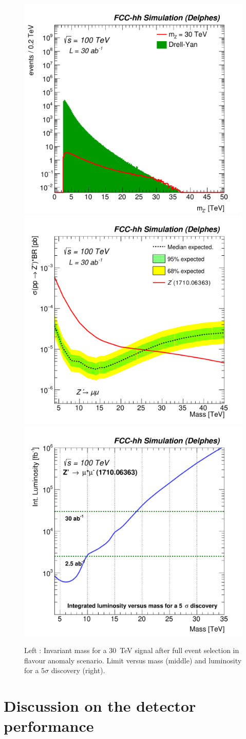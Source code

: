 \documentclass[a4paper,11pt]{article}
\begin{document}
\begin{figure}[!htb]
  \centering
  \includegraphics[width=0.32\columnwidth]{Fig/mzp_sel0_nostack_log_FA.pdf}
  \includegraphics[width=0.32\columnwidth]{Fig/lim_Zprime_mumu_fcc_v02_FA.pdf}
  \includegraphics[width=0.32\columnwidth]{Fig/DiscoveryPotential_mumu_rootStyle_FA.pdf}
  \caption{Left : Invariant mass for a 30~TeV signal after full event selection in flavour anomaly scenario. Limit versus mass (middle) and luminosity for a $5\sigma$ discovery (right). }
  \label{figure:leptonicresonances:resultsmumu_flav}
\end{figure}

\section{Discussion on the detector performance}
\label{sec:detperf}
\end{document}
